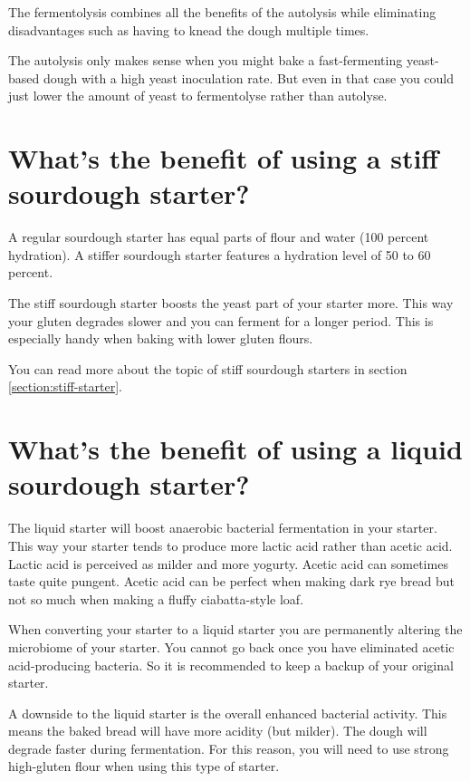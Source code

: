 The fermentolysis combines all the benefits
of the autolysis while eliminating disadvantages
such as having to knead the dough multiple times.

The autolysis only makes sense when you might
bake a fast-fermenting yeast-based dough with a
high yeast inoculation rate. But even in that
case you could just lower the amount of yeast
to fermentolyse rather than autolyse.

\section{What's the benefit of using a stiff sourdough starter?}

A regular sourdough starter has equal parts of
flour and water (100 percent hydration). A stiffer
sourdough starter features a hydration level of 50 to 60 percent.

The stiff sourdough starter boosts the yeast part
of your starter more. This way your gluten degrades
slower and you can ferment for a longer period. This
is especially handy when baking with lower gluten flours.

You can read more about the topic of stiff sourdough
starters in section \ref{section:stiff-starter}.

\section{What's the benefit of using a liquid sourdough starter?}

The liquid starter will boost anaerobic bacterial
fermentation in your starter. This way your starter
tends to produce more lactic acid rather than acetic
acid. Lactic acid is perceived as milder and more
yogurty. Acetic acid can sometimes taste quite
pungent. Acetic acid can be perfect when making 
dark rye bread but not so much when making a fluffy
ciabatta-style loaf.

When converting your starter to a liquid starter you are
permanently altering the microbiome of your starter.
You cannot go back once you have eliminated acetic
acid-producing bacteria. So it is recommended to keep
a backup of your original starter.

A downside to the liquid starter is the overall
enhanced bacterial activity. This means the baked bread
will have more acidity (but milder). The dough will degrade
faster during fermentation. For this reason, you
will need to use strong high-gluten flour when using
this type of starter.

